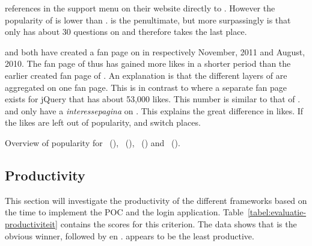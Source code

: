 \documentclass[a4paper]{artikel3}
\newcommand{\term}[1]{\emph{#1}}
\begin{document}
\kendo{} references in the support menu on their website directly to \so{}. 
However the popularity of \kendo{} is lower than \jqm{}.
\st{} is the penultimate, but more surpassingly is that \lungo{} only has about 30 questions on \so{} and therefore takes the last place.

\kendo{} and \jqm{} both have created a fan page on \fb{} in respectively November, 2011 and August, 2010.
The fan page of \kendo{} thus has gained more \fb{} likes in a shorter period than the earlier created fan page of \jqm{}.
An explanation is that the different layers of \kendo{} are aggregated on one fan page.
This is in contrast to \jqm{} where a separate fan page exists for jQuery that has about 53,000 likes.
This number is similar to that of \kendo{}.
\st{} and \lungo{} only have a \term{interessepagina} on \fb.
This explains the great difference in \fb{} likes.
If the likes are left out of popularity, \kendo{} and \jqm{} switch places.


\begin{table}
\centering
\resizebox{8.5cm}{!} {
}
\caption{Overview of popularity for \st{}~(\sta), \kendo{}~(\kendoa), \jqm{}~(\jqma) and \lungo{}~(\lungoa).}
\label{tabel:evaluatie-popularity}
\end{table}


\subsection{Productivity} %
\label{sec:evaluation-productivity}

This section will investigate the productivity of the different frameworks based on the time to implement the POC and the login application.
Table~\ref{tabel:evaluatie-productiviteit} contains the scores for this criterion.
The data shows that \lungo{} is the obvious winner,  followed by \kendo{} en \jqm{}.
\st{} appears to be the least productive.
\end{document}
